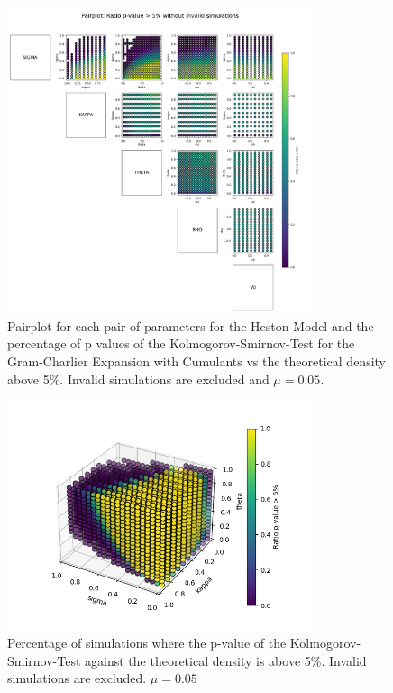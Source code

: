 \begin{figure}
    \centering
    \includegraphics[width=0.8\textwidth]{img/pairplot_GC_cum_KS.png}
    \caption{Pairplot for each pair of parameters for the Heston Model and the percentage of p values of the Kolmogorov-Smirnov-Test for the Gram-Charlier Expansion with Cumulants vs the theoretical density above 5\%. Invalid simulations are excluded and $\mu=0.05$.}
    \label{fig:pairplot_GC_cum_KS_mu005}
\end{figure}

\begin{figure}
    \centering
    \includegraphics[width=0.8\textwidth]{img/GC_cum_KS_3d_p_value_sigma_kappa_theta.png}
    \caption{Percentage of simulations where the p-value of the Kolmogorov-Smirnov-Test against the theoretical density is above 5\%. Invalid simulations are excluded. $\mu=0.05$}
    \label{fig:GC_cum_KS_3d_p_value_sigma_kappa_theta_mu005}
\end{figure}

